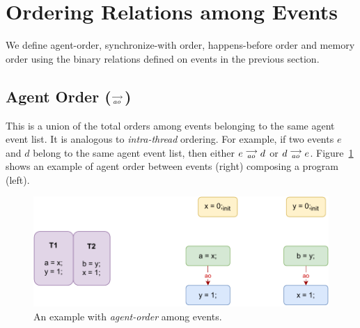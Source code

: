 \section{Ordering Relations among Events}
        
    We define agent-order, synchronize-with order, happens-before order and memory order using the binary relations defined on events in the previous section.
    \subsection{Agent Order ($\stackrel{\longrightarrow}{_{ao}}$)}
        This is a union of the total orders among events belonging to the same agent event list. 
        It is analogous to \textit{intra-thread} ordering. 
        For example, if two events $e$ and $d$ belong to the same agent event list, then either $e\stackrel{\longrightarrow}{_{ao}}d$ or $d\stackrel{\longrightarrow}{_{ao}}e$. 
        Figure~\ref{model:agent-order} shows an example of agent order between events (right) composing a program (left).
        \begin{figure}[H]
            \centering
            \includegraphics[scale=0.7]{3.ECMAScriptMemoryModel/AgentOrder.pdf}
            \caption{An example with \textit{agent-order} among events.}
            \label{model:agent-order}
        \end{figure}
    
